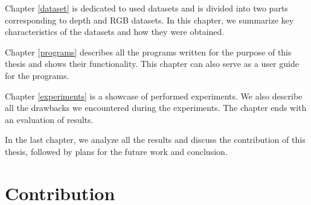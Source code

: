 Chapter \ref{dataset} is dedicated to used datasets and is divided into two parts corresponding to depth and RGB datasets. In this chapter, we summarize key characteristics of the datasets and how they were obtained.

Chapter \ref{programs} describes all the programs written for the purpose of this thesis and shows their functionality. This chapter can also serve as a user guide for the programs.

Chapter \ref{experiments} is a showcase of performed experiments. We also describe all the drawbacks we encountered during the experiments. The chapter ends with an evaluation of results.

In the last chapter, we analyze all the results and discuss the contribution of this thesis, followed by plans for the future work and conclusion.

\section{Contribution}
